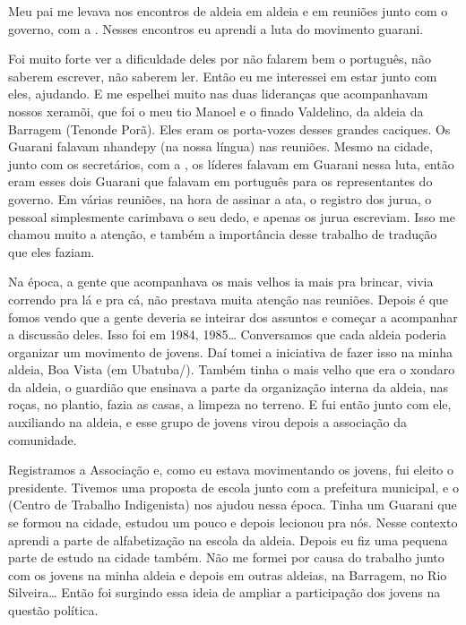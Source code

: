 Meu pai me levava nos encontros de aldeia em aldeia e em reuniões junto
com o governo, com a . Nesses encontros eu aprendi a luta do
movimento guarani. 

Foi muito forte ver a dificuldade deles por não falarem bem o português,
não saberem escrever, não saberem ler. Então eu me interessei em estar
junto com eles, ajudando. E me espelhei muito nas duas lideranças que
acompanhavam nossos xeramõi, que foi o meu tio Manoel e o finado
Valdelino, da aldeia da Barragem (Tenonde Porã). Eles eram os
porta-vozes desses grandes caciques. Os Guarani falavam nhandepy (na
nossa língua) nas reuniões. Mesmo na cidade, junto com os secretários,
com a , os líderes falavam em Guarani nessa luta, então eram esses
dois Guarani que falavam em português para os representantes do
governo. Em várias reuniões, na hora de assinar a ata, o registro dos
jurua, o pessoal simplesmente carimbava o seu dedo, e apenas os jurua
escreviam. Isso me chamou muito a atenção, e também a importância desse
trabalho de tradução que eles faziam.

Na época, a gente que acompanhava os mais velhos ia mais pra brincar,
vivia correndo pra lá e pra cá, não prestava muita atenção nas
reuniões. Depois é que fomos vendo que a gente deveria se inteirar dos
assuntos e começar a acompanhar a discussão deles. Isso foi em 1984,
1985\ldots{} Conversamos que cada aldeia poderia organizar um movimento de
jovens. Daí tomei a iniciativa de fazer isso na minha aldeia, Boa Vista
(em Ubatuba/). Também tinha o mais velho que era o xondaro da aldeia,
o guardião que ensinava a parte da organização interna da aldeia, nas
roças, no plantio, fazia as casas, a limpeza no terreno. E fui então
junto com ele, auxiliando na aldeia, e esse grupo de jovens virou
depois a associação da comunidade.

Registramos a Associação e, como eu estava movimentando os jovens, fui
eleito o presidente. Tivemos uma proposta de escola junto com a
prefeitura municipal, e o  (Centro de Trabalho Indigenista) nos
ajudou nessa época. Tinha um Guarani que se formou na cidade, estudou
um pouco e depois lecionou pra nós. Nesse contexto aprendi a parte de
alfabetização na escola da aldeia. Depois eu fiz uma pequena parte de
estudo na cidade também. Não me formei por causa do trabalho junto com
os jovens na minha aldeia e depois em outras aldeias, na Barragem, no
Rio Silveira\ldots{} Então foi surgindo essa ideia de ampliar a participação
dos jovens na questão política.


